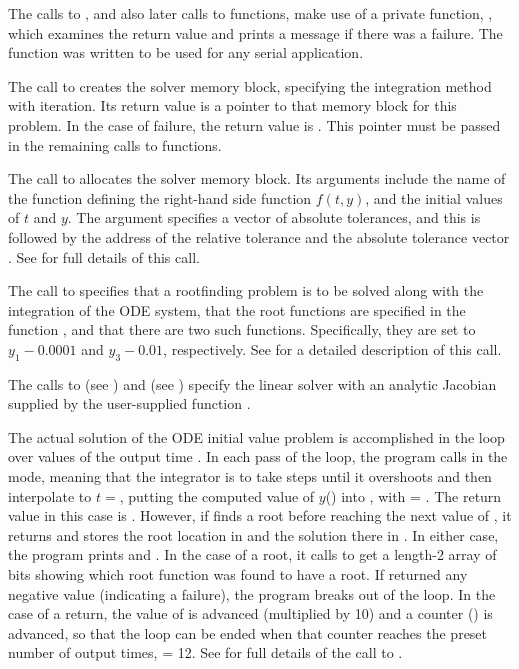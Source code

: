 The calls to , and also later calls to 
functions, make use of a private function, , which examines
the return value and prints a message if there was a failure.  The
 function was written to be used for any serial {\sundials}
application.

The call to  creates the {\cvode} solver memory block,
specifying the  integration method with  iteration.
Its return value is a pointer to that memory block for this
problem.  In the case of failure, the return value is .  This
pointer must be passed in the remaining calls to {\cvode} functions.

The call to  allocates the solver memory block.
Its arguments include the name of the {\C} function  defining the
right-hand side function $f(t,y)$, and the initial values of $t$ and $y$.
The argument  specifies a vector of absolute tolerances, and
this is followed by the address of the relative tolerance 
and the absolute tolerance vector .
See  for full details of this call.

The call to  specifies that a rootfinding problem
is to be solved along with the integration of the ODE system, that the
root functions are specified in the function , and that there are
two such functions.  Specifically, they are set to $y_1 - 0.0001$ and 
$y_3 - 0.01$, respectively.
See  for a detailed description of this call.

The calls to  (see ) and 
 (see ) specify the {\cvdense}
linear solver with an analytic Jacobian supplied by the user-supplied function
.

The actual solution of the ODE initial value problem is accomplished in
the loop over values of the output time .  In each pass of the
loop, the program calls  in the  mode, meaning that
the integrator is to take steps until it overshoots  and then
interpolate to $t = $, putting the computed value of $y$()
into , with  = .  The return value in this case is
.  However, if  finds a root before reaching the next
value of , it returns  and stores the root
location in  and the solution there in .  In either case, the
program prints  and .  In the case of a root, it calls
 to get a length-2 array  of bits showing
which root function was found to have a root.  If  returned any
negative value (indicating a failure), the program breaks out of the loop.  
In the case of a  return, the value of  is
advanced (multiplied by 10) and a counter () is advanced, so
that the loop can be ended when that counter reaches the preset number
of output times,  = 12.  See  for full
details of the call to .

